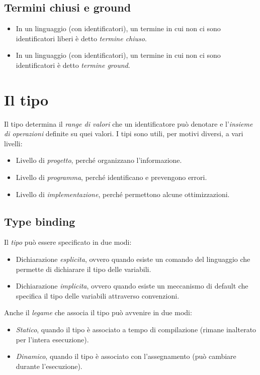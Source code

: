 \documentclass[a4paper,oneside,titlepage]{book}
\begin{document}
\subsection{Termini chiusi e ground}
\begin{itemize}
	\item In un linguaggio (con identificatori), un termine in cui non ci sono identificatori liberi è detto \textit{termine chiuso}.
	\item In un linguaggio (con identificatori), un termine in cui non ci sono identificatori è detto \textit{termine ground}.
\end{itemize}

\section{Il tipo}
Il tipo determina il \textit{range di valori} che un identificatore può denotare e l'\textit{insieme di operazioni} definite su quei valori. I tipi sono utili, per motivi diversi, a vari livelli:
\begin{itemize}
	\item Livello di \textit{progetto}, perché organizzano l'informazione.
	\item Livello di \textit{programma}, perché identificano e prevengono errori.
	\item Livello di \textit{implementazione}, perché permettono alcune ottimizzazioni.
\end{itemize}

\subsection{Type binding}
Il \textit{tipo} può essere specificato in due modi:
\begin{itemize}
	\item Dichiarazione \textit{esplicita}, ovvero quando esiste un comando del linguaggio che permette di dichiarare il tipo delle variabili.
	\item Dichiarazione \textit{implicita}, ovvero quando esiste un meccanismo di default che specifica il tipo delle variabili attraverso convenzioni.
\end{itemize}
Anche il \textit{legame} che associa il tipo può avvenire in due modi:
\begin{itemize}
	\item \textit{Statico}, quando il tipo è associato a tempo di compilazione (rimane inalterato per l'intera esecuzione).
	\item \textit{Dinamico}, quando il tipo è associato con l'assegnamento (può cambiare durante l'esecuzione).
\end{itemize}
\end{document}
